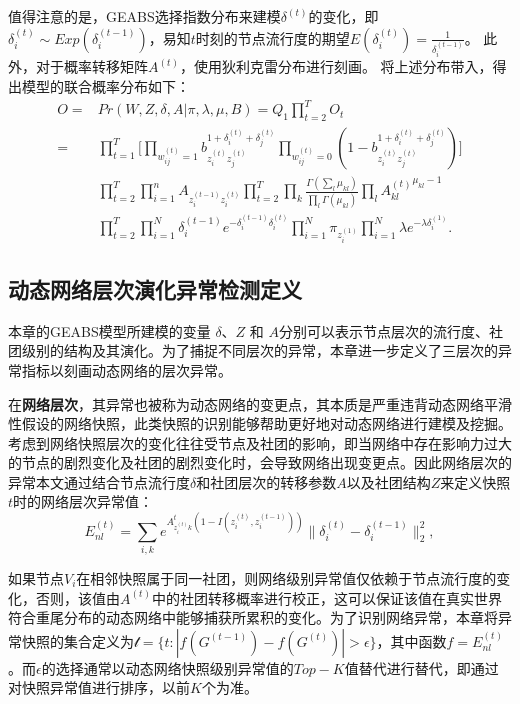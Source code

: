 值得注意的是，GEABS选择指数分布来建模$\delta^{(t)}$的变化，即 $\delta_i^{(t)} \sim Exp(\delta_i^{(t-1)})$，易知$t$时刻的节点流行度的期望$E(\delta_i^{(t)}) = \frac{1}{\delta_i^{(t-1)}}$。
此外，对于概率转移矩阵$A^{(t)}$，使用狄利克雷分布进行刻画。
将上述分布带入，得出模型的联合概率分布如下：
\begin{align}
O = & Pr(W, Z,\delta, A|\pi, \lambda, \mu, B) = Q_1 \prod_{t=2}^{T} O_t \nonumber \\
=  & \prod_{t=1}^{T} \Big[\prod_{w_{ij}^{(t)}=1} b_{z_i^{(t)} z_j^{(t)}}^{1+\delta_i^{(t)}+\delta_j^{(t)}}  \prod_{w_{ij}^{(t)}=0} (1-b_{z_i^{(t)} z_j^{(t)}}^{1+\delta_i^{(t)}+\delta_j^{(t)}})\Big]  \nonumber  \\
& \prod_{t=2}^{T} \prod_{i=1}^{n} A_{z_i^{(t-1)} z_i^{(t)}}  \prod_{t=2}^{T} \prod_{k} \frac{\Gamma (\sum_l \mu_{kl})}{\prod_l \Gamma (\mu_{kl})} \prod_l {A^{(t)}_{kl}}^{\mu_{kl} - 1} \nonumber\\
 &\prod_{t=2}^{T} \prod_{i=1}^{N} \delta_i^{(t-1)} e^{-\delta_i^{(t-1)} \delta_i^{(t)}} \prod_{i=1}^{N} \pi_{z_i^{(1)}}  \prod_{i=1}^{N} \lambda e^{-\lambda \delta_i^{(1)}}. 
\label{eq:O8}
\end{align}

\subsection{动态网络层次演化异常检测定义}
本章的GEABS模型所建模的变量 $\delta$、$Z$ 和 $A$分别可以表示节点层次的流行度、社团级别的结构及其演化。为了捕捉不同层次的异常，本章进一步定义了三层次的异常指标以刻画动态网络的层次异常。

在\textbf{网络层次}，其异常也被称为动态网络的变更点，其本质是严重违背动态网络平滑性假设的网络快照，此类快照的识别能够帮助更好地对动态网络进行建模及挖掘。考虑到网络快照层次的变化往往受节点及社团的影响，即当网络中存在影响力过大的节点的剧烈变化及社团的剧烈变化时，会导致网络出现变更点。因此网络层次的异常本文通过结合节点流行度$\delta$和社团层次的转移参数$A$以及社团结构$Z$来定义快照$t$时的网络层次异常值：
\begin{equation}
    E_{nl}^{(t)} = \sum_{i, k} e^{A_{z_i^{(t)} k}^t  (1-I(z_i^{(t)},z_i^{(t-1)}))} \| \delta_i^{(t)} - \delta_i^{(t-1)} \|_2^2,
\label{eq:O9}
\end{equation}

如果节点$V_i$在相邻快照属于同一社团，则网络级别异常值仅依赖于节点流行度的变化，否则，该值由$A^{(t)}$中的社团转移概率进行校正，这可以保证该值在真实世界符合重尾分布的动态网络中能够捕获所累积的变化。为了识别网络异常，本章将异常快照的集合定义为$\mathcal{t} = \{t : |f(G^{(t-1)}) -f(G^{(t)})| > \epsilon  \}$，其中函数$f = E_{nl}^{(t)}$。而$\epsilon$的选择通常以动态网络快照级别异常值的$Top-K$值替代进行替代，即通过对快照异常值进行排序，以前$K$个为准。

